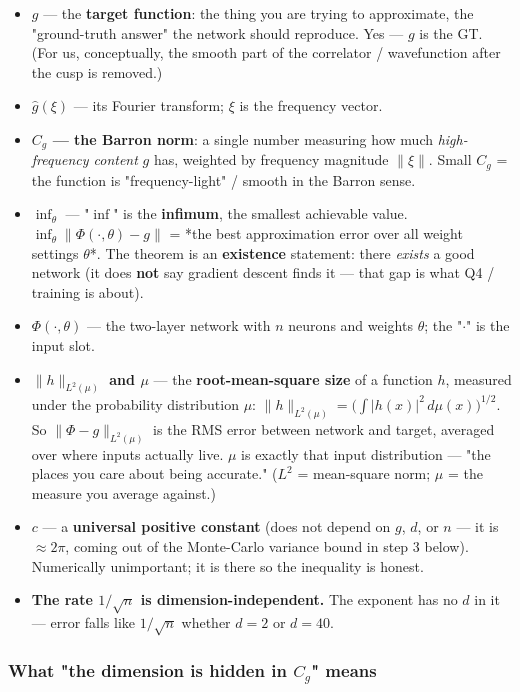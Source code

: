 \documentclass[11pt]{article}
\begin{document}
\begin{itemize}
\item \textbf{$g$} --- the \textbf{target function}: the thing you are trying to
approximate, the "ground-truth answer" the network should reproduce.
Yes --- $g$ is the GT. (For us, conceptually, the smooth part of the
correlator / wavefunction after the cusp is removed.)
\item \textbf{$\hat g(\xi)$} --- its Fourier transform; $\xi$ is the frequency vector.
\item \textbf{$C_g$ --- the Barron norm}: a single number measuring how much
\emph{high-frequency content} $g$ has, weighted by frequency magnitude
$\|\xi\|$. Small $C_g$ = the function is "frequency-light" / smooth in the
Barron sense.
\item \textbf{$\inf_\theta$} --- "$\inf$" is the \textbf{infimum}, the smallest achievable
value. $\inf_\theta\|\Phi(\cdot,\theta)-g\|$ = *the best approximation
error over all weight settings $\theta$*. The theorem is an \textbf{existence}
statement: there \emph{exists} a good network (it does \textbf{not} say gradient
descent finds it --- that gap is what Q4 / training is about).
\item \textbf{$\Phi(\cdot,\theta)$} --- the two-layer network with $n$ neurons and
weights $\theta$; the "$\cdot$" is the input slot.
\item \textbf{$\|h\|_{L^2(\mu)}$ and $\mu$} --- the \textbf{root-mean-square size} of a
function $h$, measured under the probability distribution $\mu$:
$\|h\|_{L^2(\mu)} = \big(\int |h(x)|^2\,d\mu(x)\big)^{1/2}$. So
$\|\Phi - g\|_{L^2(\mu)}$ is the RMS error between network and target,
averaged over where inputs actually live. \textbf{$\mu$} is exactly that
input distribution --- "the places you care about being accurate." ($L^2$
= mean-square norm; $\mu$ = the measure you average against.)
\item \textbf{$c$} --- a \textbf{universal positive constant} (does not depend on $g$, $d$,
or $n$ --- it is $\approx 2\pi$, coming out of the Monte-Carlo variance
bound in step 3 below). Numerically unimportant; it is there so the
inequality is honest.
\item \textbf{The rate $1/\sqrt n$ is dimension-independent.} The exponent has no
$d$ in it --- error falls like $1/\sqrt n$ whether $d=2$ or $d=40$.
\end{itemize}
\subsubsection*{What "the dimension is hidden in $C_g$" means}
\end{document}
